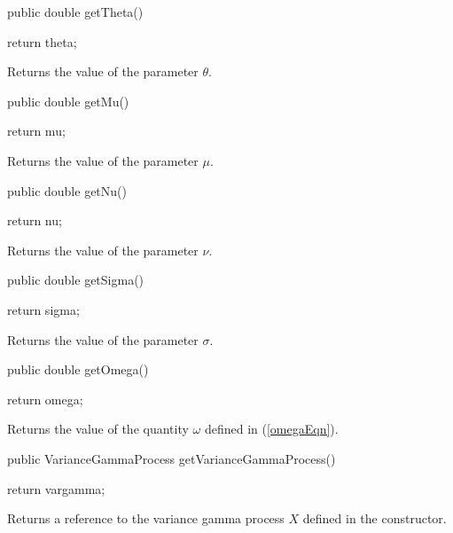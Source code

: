 \begin{code}

   public double getTheta() \begin{hide} { return theta; }\end{hide}
\end{code}
\begin{tabb}
Returns the value of the parameter $\theta$.
\end{tabb}
\begin{code}

   public double getMu() \begin{hide} { return mu; }\end{hide}
\end{code}
\begin{tabb}
Returns the value of the parameter $\mu$.
\end{tabb}
\begin{code}

   public double getNu() \begin{hide} { return nu; }\end{hide}
\end{code}
\begin{tabb}
Returns the value of the parameter $\nu$.
\end{tabb}
\begin{code}

   public double getSigma() \begin{hide} { return sigma; }\end{hide}
\end{code}
\begin{tabb}
Returns the value of the parameter $\sigma$.
\end{tabb}
\begin{code}

   public double getOmega() \begin{hide} { return omega; }\end{hide}
\end{code}
\begin{tabb}
Returns the value of the quantity $\omega$ defined in (\ref{omegaEqn}).
\end{tabb}
\begin{code}

   public VarianceGammaProcess getVarianceGammaProcess() \begin{hide} {
        return vargamma;
}\end{hide}
\end{code}
\begin{tabb} Returns a reference to the variance gamma process $X$ defined
in the constructor.
\end{tabb}
